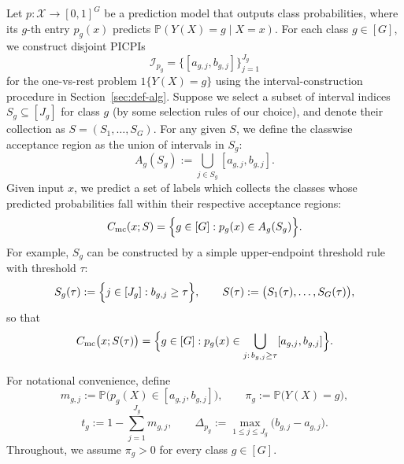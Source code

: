 \documentclass[11pt]{article}
\theoremstyle{statplain}
\theoremstyle{statdefinition}
\newcommand{\mc}{\mathrm{mc}}
\newcommand{\PP}{\mathbb{P}}
\newcommand{\0}{\mathbf{0}}
\newcommand{\I}{\mathcal{I}}
\newcommand{\X}{\mathcal{X}}
\newcommand{\intervalset}{\I} %
\newcommand{\numClass}{G} %
\newcommand{\iteratorClass}{g}
\newcommand{\mcThreshold}{\tau} %
\newcommand{\intervalMaxLen}{\Delta} %
\newcommand{\titleShorts}{PICPIs\xspace}
\begin{document}
Let $p: \X \rightarrow [0,1]^\numClass$ be a prediction model that outputs class probabilities, where its $\iteratorClass$-th entry 
$p_\iteratorClass(x)$ predicts ${\PP}(Y(X)=\iteratorClass \mid X=x)$.
For each class $\iteratorClass\in[\numClass]$, we construct disjoint \titleShorts
\[
\intervalset_{p_\iteratorClass}
=
\big\{[a_{\iteratorClass,j},b_{\iteratorClass,j}]\big\}_{j=1}^{J_\iteratorClass}
\]
for the one-vs-rest problem $1\{Y(X)=\iteratorClass\}$ using the interval-construction procedure in Section~\ref{sec:def-alg}.
Suppose we select a subset of interval indices $S_\iteratorClass\subseteq [J_\iteratorClass]$ for class $g$ (by some selection rules of our choice), and denote their collection as $S=(S_1,\ldots,S_\numClass)$.
For any given $S$, we define the classwise acceptance region as the union of intervals in $S_\iteratorClass$:
\[
A_\iteratorClass(S_\iteratorClass)
:=
\bigcup_{j\in S_\iteratorClass}[a_{\iteratorClass,j},b_{\iteratorClass,j}].
\]
Given input $x$, we predict a set of labels which collects the classes whose predicted probabilities fall within their respective acceptance regions:
\begin{align}\label{eq:mc_acceptance}
C_{\mc}(x;S)
=
\Bigl\{\iteratorClass\in[\numClass]:
p_\iteratorClass(x)\in A_\iteratorClass(S_\iteratorClass)\Bigr\}.
\end{align}
For example, $S_\iteratorClass$ can be constructed by a simple upper-endpoint threshold rule with threshold $\tau$:
\begin{align}\label{eq:classification_thresholding_rule}
S_\iteratorClass(\mcThreshold)
:=
\Bigl\{j\in[J_\iteratorClass]: b_{\iteratorClass,j}\ge \mcThreshold\Bigr\},
\qquad
S(\mcThreshold)
:=
\bigl(S_1(\mcThreshold),\ldots,S_\numClass(\mcThreshold)\bigr),
\end{align}
so that
\begin{align}\label{eq:task-classification}
    C_{\mc}\bigl(x;S(\mcThreshold)\bigr)
    =
    \Bigl\{\iteratorClass\in[\numClass]:
    p_\iteratorClass(x)\in \bigcup_{j:\,b_{\iteratorClass,j}\ge \mcThreshold}
    [a_{\iteratorClass,j},b_{\iteratorClass,j}]
    \Bigr\}.
\end{align}



For notational convenience, define
\[
m_{\iteratorClass,j}
:=
\PP\bigl(p_\iteratorClass(X)\in [a_{\iteratorClass,j},b_{\iteratorClass,j}]\bigr),
\qquad
\pi_\iteratorClass
:=
\PP\bigl(Y(X)=\iteratorClass\bigr),
\]
\[
t_\iteratorClass
:=
1-\sum_{j=1}^{J_\iteratorClass} m_{\iteratorClass,j},
\qquad
\intervalMaxLen_{p_\iteratorClass}
:=
\max_{1\le j\le J_\iteratorClass}\bigl(b_{\iteratorClass,j}-a_{\iteratorClass,j}\bigr).
\]
Throughout, we assume $\pi_\iteratorClass>0$ for every class $\iteratorClass\in[\numClass]$.
\end{document}
